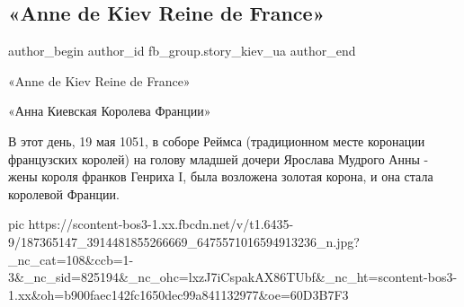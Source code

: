  
 
 
 
 
 
\subsection{«Anne de Kiev Reine de France»}
\label{sec:19_05_2021.fb.fb_group.story_kiev_ua.1.anne_reine_de_kiev}
\ifcmt
 author_begin
   author_id fb_group.story_kiev_ua
 author_end
\fi

«Anne de Kiev Reine de France»                                                 

«Анна Киевская Королева Франции»

В этот день, 19 мая 1051, в соборе Реймса (традиционном месте коронации
французских королей) на голову младшей дочери Ярослава Мудрого Анны - жены
короля франков Генриха I,  была возложена золотая корона, и она стала королевой
Франции.

\ifcmt
  pic https://scontent-bos3-1.xx.fbcdn.net/v/t1.6435-9/187365147_3914481855266669_6475571016594913236_n.jpg?_nc_cat=108&ccb=1-3&_nc_sid=825194&_nc_ohc=lxzJ7iCspakAX86TUbf&_nc_ht=scontent-bos3-1.xx&oh=b900faec142fc1650dec99a841132977&oe=60D3B7F3
\fi


